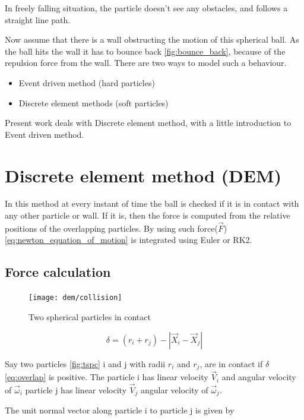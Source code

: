 In freely falling situation, the particle doesn't see any obstacles,
and follows a straight line path.

Now assume that there is a wall obstructing the motion of this
spherical ball.  As the ball hits the wall it has to bounce back
\eqref{fig:bounce_back}, because of the repulsion force from the
wall. There are two ways to model such a behaviour.

\begin{itemize}
\item Event driven method (hard particles)
\item Discrete element methods (soft particles)
\end{itemize}


Present work deals with Discrete element method, with a little introduction
to Event driven method.

\section{Discrete element method (DEM)}
\label{sec:edm}

In this method at every instant of time the ball is checked if it is
in contact with any other particle or wall. If it is, then the force
is computed from the relative positions of the overlapping
particles. By using such force($\vec{F}$) \eqref{eq:newton_equation_of_motion} is
integrated using Euler or RK2.

\subsection{Force calculation}
\label{sec:force}

\begin{figure}
  \centering
  \texttt{[image: dem/collision]}
  \caption{Two spherical particles in contact}
  \label{fig:tspc}
\end{figure}

\begin{equation}
  \label{eq:overlap}
  \delta = (r_i + r_j) - |\vec{X}_{i} - \vec{X}_{j}|
\end{equation}

Say two particles \eqref{fig:tspc} i and j with radii $r_{i}$ and
$r_{j}$, are in contact if $\delta$ \eqref{eq:overlap} is positive.
The particle i has linear velocity $\vec{V}_{i}$ and angular velocity
of $\vec{\omega}_{i}$ particle j has linear velocity $\vec{V}_{j}$ angular
velocity of $\vec{\omega}_{j}$.

The unit normal vector along particle i to particle j  is given by

